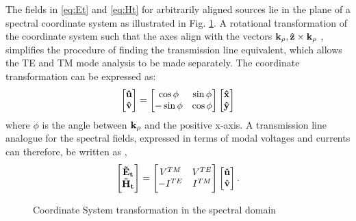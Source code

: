 \documentclass[12pt]{article}
\begin{document}
The fields in \eqref{eq:Et} and  \eqref{eq:Ht} for arbitrarily aligned sources lie in the plane of a spectral coordinate system as illustrated in Fig. \ref{fig:SpCS}. A rotational transformation of the coordinate system such that the axes align with the vectors $\mathbf{k_{\rho}}, \mathbf{\hat z} \times \mathbf{k_{\rho}}$ \cite{itoh1980}, simplifies the procedure of finding the transmission line equivalent, which allows the TE and TM mode analysis to be made separately. The coordinate transformation can be expressed as:
%
\begin{equation}
  \begin{bmatrix}
    \mathbf{\hat u} \\
    \mathbf{\hat v}
  \end{bmatrix}
  =
  \begin{bmatrix}
    \cos \phi & \sin \phi \\
    -\sin \phi & \cos \phi
  \end{bmatrix}
  \begin{bmatrix}
    \mathbf{\hat x} \\
    \mathbf{\hat y}
  \end{bmatrix}
  \label{eq:transformation}
\end{equation}
%
where $\phi$ is the angle between $\mathbf{k_{\rho}}$ and the positive x-axis. A transmission line analogue for the spectral fields, expressed in terms of modal voltages and currents can therefore, be written as \cite{kastner1988, michalski1997multilayered},
%
\begin{equation}
  \begin{bmatrix}
    \mathbf{\tilde{E}_t} \\
    \mathbf{\tilde{H}_t}
  \end{bmatrix}
  =
  \begin{bmatrix}
    V^{TM} & V^{TE} \\
    -I^{TE} & I^{TM}
  \end{bmatrix}
  \begin{bmatrix}
    \mathbf{\hat u} \\
    \mathbf{\hat v}
  \end{bmatrix}.
  \label{eq:EHVI}
\end{equation}
%
\begin{figure}[t!]
  \centering
  \def\svgwidth{.5\linewidth}
  
  \caption{Coordinate System transformation in the spectral domain}
  \label{fig:SpCS}
\end{figure}
\end{document}
